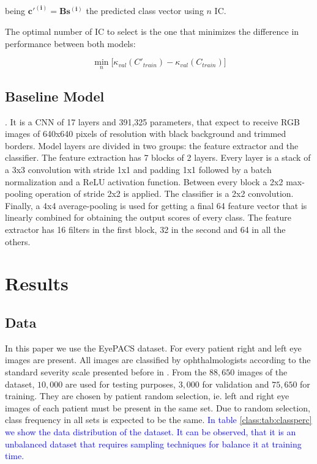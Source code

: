 \documentclass[review]{elsarticle}
\theoremstyle{definition} %
\theoremstyle{remark}
\begin{document}
being $\boldsymbol{c'^{(i)}} = \boldsymbol{B} \boldsymbol{s^{(i)}}$ the predicted class vector using $n$ IC.

The optimal number of IC to select is the one that minimizes the difference in performance between both models:

\begin{equation}
\min_{n} \big[ \kappa_{val} (C'_{train}) - \kappa_{val} (C_{train}) \big] 
\end{equation}

\subsection{Baseline Model}

. It is a CNN of 17 layers and 391,325 parameters, that expect to receive RGB images of 640x640 pixels of resolution with black background and trimmed borders. Model layers are divided in two groups: the feature extractor and the classifier. The feature extraction has 7 blocks of 2 layers. Every layer is a stack of a 3x3 convolution with stride 1x1 and padding 1x1 followed by a batch normalization and a ReLU activation function. Between every block a 2x2 max-pooling operation of stride 2x2 is applied.  The classifier is a 2x2 convolution. Finally, a 4x4 average-pooling is used for getting a final 64 feature vector that is linearly combined for obtaining the output scores of every class. The feature extractor has 16 filters in the first block, 32 in the second and 64 in all the others.


\section{Results}\label{sec:results}

\subsection{Data}

In this paper we use the EyePACS dataset. For every patient right and left eye images are present. All images are classified by ophthalmologists according to the standard severity scale presented before in \cite{diaclass}. From the $88,650$ images of the dataset, $10,000$ are used for testing purposes, $3,000$ for validation and $75,650$ for training. They are chosen by patient random selection, ie. left and right eye images of each patient must be present in the same set. Due to random selection, class frequency in all sets is expected to be the same. \textcolor{blue}{In table \ref{class:tab:classperc} we show the data distribution of the dataset. It can be observed, that it is an unbalanced dataset that requires sampling techniques for balance it at training time.}
\end{document}
